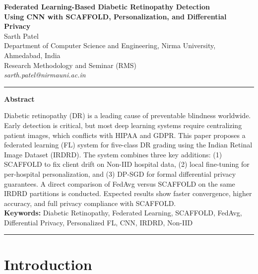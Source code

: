 \documentclass[12pt, a4paper]{article}
\begin{document}

\begin{center}
{\Large \textbf{Federated Learning-Based Diabetic Retinopathy Detection\\
Using CNN with SCAFFOLD, Personalization, and Differential Privacy}}\\[10pt]
{\normalsize Sarth Patel}\\[4pt]
{\small Department of Computer Science and Engineering, Nirma University, Ahmedabad, India}\\[2pt]
{\small Research Methodology and Seminar (RMS)}\\[2pt]
{\small \textit{sarth.patel@nirmauni.ac.in}}
\end{center}

\noindent\rule{\textwidth}{0.4pt}

\begin{center}
\textbf{Abstract}
\end{center}

\noindent
Diabetic retinopathy (DR) is a leading cause of preventable blindness worldwide. Early detection is critical, but most deep learning systems require centralizing patient images, which conflicts with HIPAA and GDPR. This paper proposes a federated learning (FL) system for five-class DR grading using the Indian Retinal Image Dataset (IRDRD). The system combines three key additions: (1) SCAFFOLD to fix client drift on Non-IID hospital data, (2) local fine-tuning for per-hospital personalization, and (3) DP-SGD for formal differential privacy guarantees. A direct comparison of FedAvg versus SCAFFOLD on the same IRDRD partitions is conducted. Expected results show faster convergence, higher accuracy, and full privacy compliance with SCAFFOLD.\\[4pt]

\noindent\textbf{Keywords:} Diabetic Retinopathy, Federated Learning, SCAFFOLD, FedAvg, Differential Privacy, Personalized FL, CNN, IRDRD, Non-IID

\noindent\rule{\textwidth}{0.4pt}

\section{Introduction}
\end{document}
